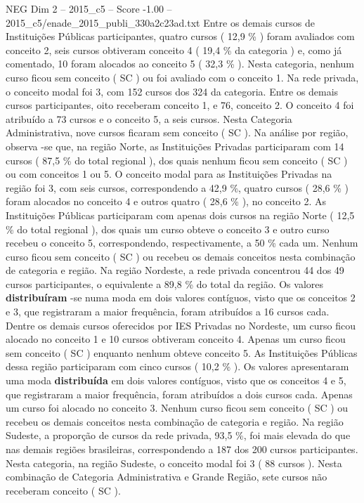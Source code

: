 \begin{textsample}{NEG Dim 2 – 2015\_c5 – Score -1.00 – 2015\_c5/enade\_2015\_publi\_330a2c23ad.txt}
Entre os demais cursos de Instituições Públicas participantes, quatro cursos ( 12,9 \% ) foram avaliados com conceito 2, seis cursos obtiveram conceito 4 ( 19,4 \% da categoria ) e, como já comentado, 10 foram alocados ao conceito 5 ( 32,3 \% ).
Nesta categoria, nenhum curso ficou sem conceito ( SC ) ou foi avaliado com o conceito 1.
Na rede privada, o conceito modal foi 3, com 152 cursos dos 324 da categoria.
Entre os demais cursos participantes, oito receberam conceito 1, e 76, conceito 2.
O conceito 4 foi atribuído a 73 cursos e o conceito 5, a seis cursos.
Nesta Categoria Administrativa, nove cursos ficaram sem conceito ( SC ).
Na análise por região, observa -se que, na região Norte, as Instituições Privadas participaram com 14 cursos ( 87,5 \% do total regional ), dos quais nenhum ficou sem conceito ( SC ) ou com conceitos 1 ou 5.
O conceito modal para as Instituições Privadas na região foi 3, com seis cursos, correspondendo a 42,9 \%, quatro cursos ( 28,6 \% ) foram alocados no conceito 4 e outros quatro ( 28,6 \% ), no conceito 2.
As Instituições Públicas participaram com apenas dois cursos na região Norte ( 12,5 \% do total regional ), dos quais um curso obteve o conceito 3 e outro curso recebeu o conceito 5, correspondendo, respectivamente, a 50 \% cada um.
Nenhum curso ficou sem conceito ( SC ) ou recebeu os demais conceitos nesta combinação de categoria e região.
Na região Nordeste, a rede privada concentrou 44 dos 49 cursos participantes, o equivalente a 89,8 \% do total da região.
Os valores \textbf{distribuíram} -se numa moda em dois valores contíguos, visto que os conceitos 2 e 3, que registraram a maior frequência, foram atribuídos a 16 cursos cada.
Dentre os demais cursos oferecidos por IES Privadas no Nordeste, um curso ficou alocado no conceito 1 e 10 cursos obtiveram conceito 4.
Apenas um curso ficou sem conceito ( SC ) enquanto nenhum obteve conceito 5.
As Instituições Públicas dessa região participaram com cinco cursos ( 10,2 \% ).
Os valores apresentaram uma moda \textbf{distribuída} em dois valores contíguos, visto que os conceitos 4 e 5, que registraram a maior frequência, foram atribuídos a dois cursos cada.
Apenas um curso foi alocado no conceito 3.
Nenhum curso ficou sem conceito ( SC ) ou recebeu os demais conceitos nesta combinação de categoria e região.
Na região Sudeste, a proporção de cursos da rede privada, 93,5 \%, foi mais elevada do que nas demais regiões brasileiras, correspondendo a 187 dos 200 cursos participantes.
Nesta categoria, na região Sudeste, o conceito modal foi 3 ( 88 cursos ).
Nesta combinação de Categoria Administrativa e Grande Região, sete cursos não receberam conceito ( SC ).

\end{textsample}
